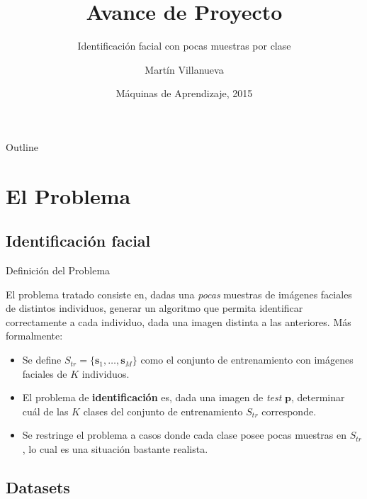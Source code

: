 \documentclass{beamer}
\title{Avance de Proyecto}
\subtitle{Identificación facial con pocas muestras por clase}
\author{Martín Villanueva\inst{1}}
\institute[Universidad Técnica Federico Santa María] %
{
  \inst{1}%
  Departamento de Informática\\
  Universidad Técnica Federico Santa María}
\date{Máquinas de Aprendizaje, 2015}
\begin{document}
\begin{frame}
  \titlepage
\end{frame}



\begin{frame}{Outline}
  \tableofcontents
\end{frame}




\section{El Problema}
\subsection{Identificación facial}

\begin{frame}{Definición del Problema}

El problema tratado consiste en, dadas una \textit{pocas} muestras de imágenes faciales de distintos individuos, generar un algoritmo que permita identificar correctamente a cada individuo, dada una imagen distinta a las anteriores. Más formalmente:

\begin{itemize}
 \item Se define $S_{tr} =  \{\mathbf{s}_1 , \ldots, \mathbf{s}_M \}$ como el conjunto de entrenamiento con imágenes faciales de $K$ individuos.
 \item El problema de \textbf{identificación} es, dada una imagen de \textit{test} $\mathbf{p}$, determinar cuál de las $K$ clases del conjunto de entrenamiento $S_{tr}$ corresponde.
 \item Se restringe el problema a casos donde cada clase posee pocas muestras en $S_{tr}$, lo cual es una situación bastante realista.
\end{itemize}
\end{frame}


\subsection{Datasets}
\end{document}
